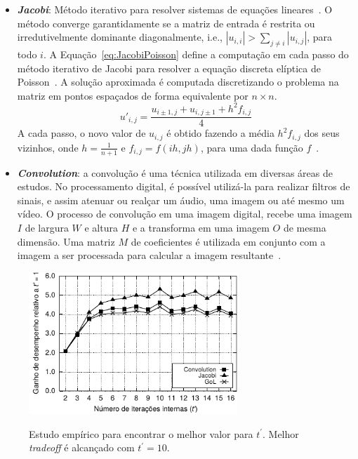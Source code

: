 \begin{itemize}
  \item \textbf{\textit{Jacobi}}: Método iterativo para resolver sistemas de equações lineares~\cite{demmel97}.
  O método converge garantidamente se a matriz de entrada é restrita ou irredutivelmente dominante diagonalmente, i.e., $|u_{i,i}| > \sum_{j\neq i}{|u_{i,j}|}$, para todo $i$.
  A Equação~\ref{eq:JacobiPoisson} define a computação em cada passo do método iterativo de Jacobi para resolver a equação discreta elíptica de Poisson~\cite{demmel97}. A solução aproximada é computada discretizando o problema na matriz em pontos espaçados de forma equivalente por $n\times n$.\\
   \begin{equation}
   u'_{i,j} = \frac{u_{i\pm1,j} + u_{i,j\pm1} + h^2f_{i,j}}{4}
   \label{eq:JacobiPoisson}
   \end{equation}
   A cada passo, o novo valor de $u_{i,j}$ é obtido fazendo a média $h^2f_{i,j}$ dos seus vizinhos, onde $h = \frac{1}{n+1}$ e $f_{i,j} = f(ih,jh)$,
   para uma dada função $f$~\cite{Podesta:TCC}.

  \item \textbf{\textit{Convolution}}: a convolução é uma técnica utilizada em diversas áreas de estudos. No processamento digital, é possível utilizá-la para realizar filtros de sinais, e assim atenuar ou realçar um áudio, uma imagem ou até mesmo um vídeo. O processo de convolução em uma imagem digital, recebe uma imagem $\mathit{I}$ de largura $\mathit{W}$ e altura $\mathit{H}$ e a transforma em uma imagem $\mathit{O}$ de mesma dimensão. Uma matriz $\mathit{M}$ de coeficientes é utilizada em conjunto com a imagem a ser processada para calcular a imagem resultante~\cite{CPE:CPE3479}.
\end{itemize}

\begin{figure}[H]
  \centering
	\caption{Estudo empírico para encontrar o melhor valor para $t^\prime$. Melhor \textit{tradeoff} é alcançado com $t^\prime=10$.}
	\includegraphics[width=0.7\textwidth]{figs/MPPAPlotIterationsAPI100It16InnerIt.pdf}
	\label{fig:tprime}
\end{figure}


